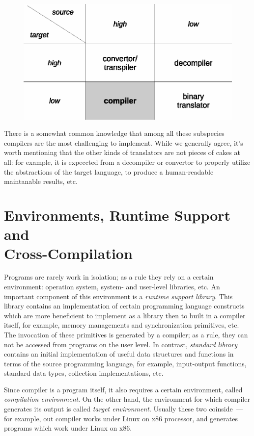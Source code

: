 \begin{figure}[h]
  \centering
  \includegraphics[scale=0.7]{images/01-05.eps}
\end{figure}

There is a somewhat common knowledge that among all these subspecies compilers are the most challenging to implement. While
we generally agree, it's worth mentioning that the other kinds of translators are not pieces of cakes at all: for example,
it is expeccted from a decompiler or convertor to properly utilize the abstractions of the target language, to produce a
human-readable maintanable results, etc.

\section{Environments, Runtime Support and\\
  Cross-Compilation}

Programs are rarely work in isolation; as a rule they rely on a certain environment: operation system, system- and user-level
libraries, etc. An important component of this environment is a \emph{runtime support library}. This library contains
an implementation of certain programming language constructs which are more beneficient to implement as a
library then to built in a compiler itself, for example, memory managements and synchronization primitives, etc. The
invocation of these primitives is generated by a compiler; as a rule, they can not be accessed from programs on the user level.
In contrast, \emph{standard library} contains an initial implementation of useful data structures and functions
in terms of the source programming language, for example, input-output functions, standard data types, collection implementations, etc.

Since compiler is a program itself, it also requires a certain environment, called \emph{compilation environment}.
On the other hand, the environment for which compiler generates its output is called \emph{target environment}. Usually these two
coinside~--- for example, out \lama compiler works under Linux on x86 processor, and generates programs which work
under Linux on x86.

